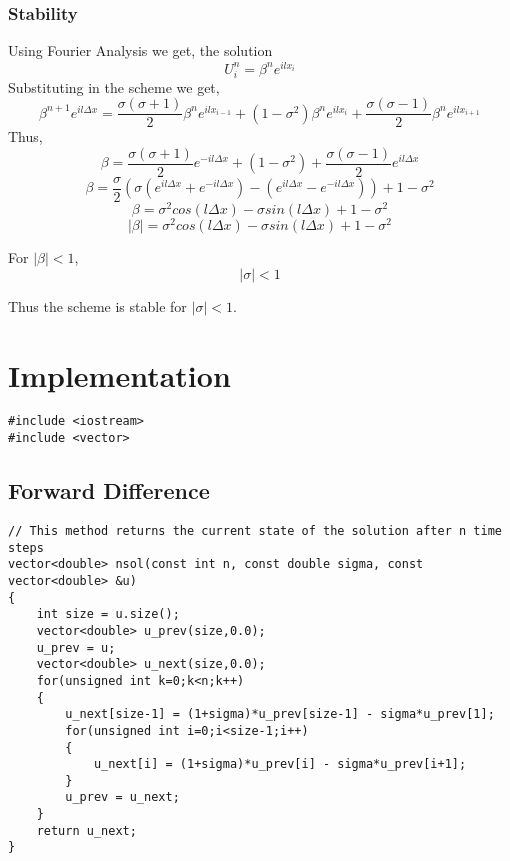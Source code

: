 \documentclass[11pt]{article}
\begin{document}
\subsubsection{Stability}
\label{sec:org572fd9f}

Using Fourier Analysis we get, the solution
$$U_i^n = \beta^n e^{i l x_i}$$
Substituting in the scheme we get,
$$\beta^{n+1} e^{i l \Delta x} = \frac{\sigma \left( \sigma + 1 \right)}{2} \beta^{n} e^{i l x_{i-1}} + \left( 1 - \sigma^2 \right) \beta^{n} e^{i l x_i} + \frac{\sigma \left( \sigma - 1 \right)}{2} \beta^{n} e^{i l x_{i+1}}$$
Thus,
$$\beta = \frac{\sigma \left( \sigma + 1 \right)}{2} e^{- i l \Delta x} + \left( 1 - \sigma^2 \right) + \frac{\sigma \left( \sigma - 1 \right)}{2} e^{i l \Delta x}$$
$$\beta = \frac{\sigma}{2} \left( \sigma (e^{i l \Delta x} + e^{- i l \Delta x}) - (e^{i l \Delta x} - e^{- i l \Delta x}) \right) + 1 - \sigma^2$$
$$\beta = \sigma^2 cos(l \Delta x) - \sigma sin(l \Delta x) + 1 - \sigma^2$$
$$\lvert \beta \rvert = \sigma^2 cos(l \Delta x) - \sigma sin(l \Delta x) + 1 - \sigma^2$$

For \(\lvert \beta \rvert < 1\), 
$$\lvert \sigma \rvert < 1$$

Thus the scheme is stable for \(\lvert \sigma \rvert < 1\).
\section{Implementation}
\label{sec:org458c85c}
\begin{verbatim}
#include <iostream>
#include <vector>
\end{verbatim}

\subsection{Forward Difference}
\label{sec:org0bd02da}
\begin{verbatim}
// This method returns the current state of the solution after n time steps
vector<double> nsol(const int n, const double sigma, const vector<double> &u)
{
    int size = u.size();
    vector<double> u_prev(size,0.0);
    u_prev = u;
    vector<double> u_next(size,0.0);
    for(unsigned int k=0;k<n;k++)
    {
        u_next[size-1] = (1+sigma)*u_prev[size-1] - sigma*u_prev[1];
        for(unsigned int i=0;i<size-1;i++)
        {
            u_next[i] = (1+sigma)*u_prev[i] - sigma*u_prev[i+1];
        }
        u_prev = u_next;
    }
    return u_next;
}
\end{verbatim}
\end{document}
